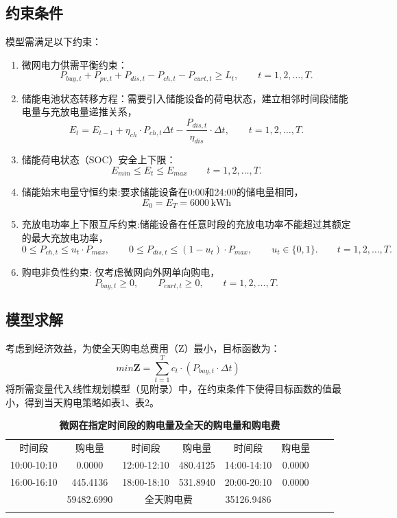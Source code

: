 \documentclass{cumcmthesis}
\begin{document}
    \subsection{约束条件}
    模型需满足以下约束：
    \begin{enumerate}
        \item 微网电力供需平衡约束：
        \[
        P_{buy,t}+P_{pv,t}+P_{dis,t}-P_{ch,t}-P_{curt,t} \ge L_t,
        \qquad t=1,2,\ldots,T.
        \]
        \item 储能电池状态转移方程：需要引入储能设备的荷电状态，建立相邻时间段储能电量与充放电量递推关系，
        \[
        E_t = E_{t-1}+\eta_{ch}\cdot P_{ch,t}\Delta t-\frac{P_{dis,t}}{\eta_{dis}} \cdot \Delta t,
        \qquad t=1,2,\ldots,T.
        \]
        \item 储能荷电状态（SOC）安全上下限：\[E_{min}\leqslant E_t\leqslant E_{max}  \qquad t=1,2,\ldots,T.\]
        \item 储能始末电量守恒约束:要求储能设备在0:00和24:00的储电量相同，
        \[
        E_0=E_T=6000\,\text{kWh}
        \]
        \item 充放电功率上下限互斥约束:储能设备在任意时段的充放电功率不能超过其额定的最大充放电功率，
        \[
        0\leqslant P_{ch,t}\leqslant u_t\cdot P_{max},\qquad
        0\leqslant P_{dis,t}\leqslant (1-u_t)\cdot P_{max},\qquad
        u_t\in\{0,1\}.\qquad t=1,2,\ldots,T.
        \]
        \item 购电非负性约束:
        仅考虑微网向外网单向购电，
        \[
        P_{buy,t}\ge 0,\qquad P_{curt,t}\ge 0,\qquad t=1,2,\ldots,T.
        \]
        \end{enumerate}
    \subsection{模型求解}
     考虑到经济效益，为使全天购电总费用（Z）最小，目标函数为：
     \begin{equation}
     min \mathbf{Z} =\sum_{t= 1}^{T} c_t\cdot (P_{buy,t}\cdot \Delta t) 
     \end{equation}
将所需变量代入线性规划模型（见附录）中，在约束条件下使得目标函数的值最小，得到当天购电策略如表1、表2。
\begin{table}[h]
    \centering
    \caption{\textbf{微网在指定时间段的购电量及全天的购电量和购电费}}
\label{tab:storage_energy}
\begin{tabular}{|c|c|c|c|c|c|c|c|}
    \noalign{\hrule}
    时间段 & 购电量 & 时间段 & 购电量 & 时间段 & 购电量 \\
    \noalign{\hrule}
    10:00-10:10 & 0.0000 & 12:00-12:10 &480.4125  & 14:00-14:10& 0.0000 \\
    \noalign{\hrule}
    16:00-16:10 & 445.4136 & 18:00-18:10 & 531.8940 & 20:00-20:10 & 0.0000\\
    \noalign{\hrule}
    
    \multicolumn{2}{|c|}{全天购电量} & 59482.6990  & \multicolumn{2}{|c|}{全天购电费} &  35126.9486\\
    \noalign{\hrule}
    \end{tabular}

    \end{table}
   
\end{document}
